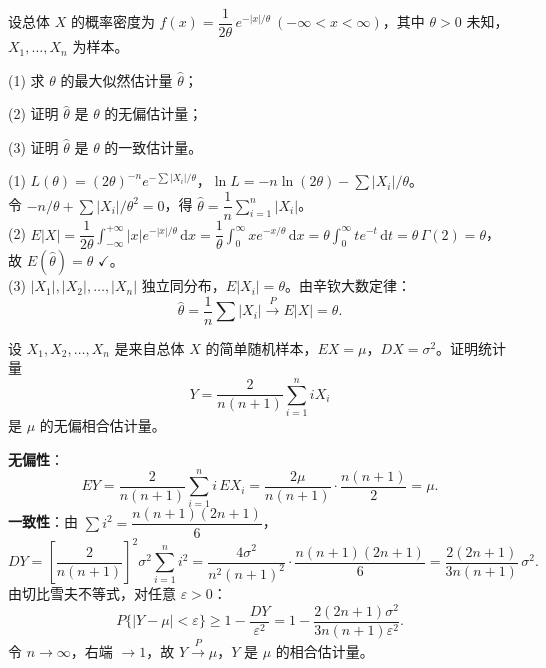 \documentclass[lang=cn,11pt]{elegantbook}
\begin{document}
\begin{exercise}\label{exer:7-laplace}
设总体 \(X\) 的概率密度为 \(f(x) = \dfrac{1}{2\theta}\,e^{-|x|/\theta}\ (-\infty < x < \infty)\)，其中 \(\theta > 0\) 未知，\(X_1, \dots, X_n\) 为样本。\par
(1) 求 \(\theta\) 的最大似然估计量 \(\hat{\theta}\)；\par
(2) 证明 \(\hat{\theta}\) 是 \(\theta\) 的无偏估计量；\par
(3) 证明 \(\hat{\theta}\) 是 \(\theta\) 的一致估计量。
\end{exercise}
\begin{solution}
(1) \(L(\theta) = (2\theta)^{-n}e^{-\sum|X_i|/\theta}\)，\(\ln L = -n\ln(2\theta) - \sum|X_i|/\theta\)。\\
令 \(-n/\theta + \sum|X_i|/\theta^2 = 0\)，得 \(\hat{\theta} = \dfrac{1}{n}\sum_{i=1}^{n}|X_i|\)。\\
(2) \(E|X| = \dfrac{1}{2\theta}\displaystyle\int_{-\infty}^{+\infty}|x|e^{-|x|/\theta}\,\mathrm{d}x = \dfrac{1}{\theta}\int_0^\infty xe^{-x/\theta}\,\mathrm{d}x = \theta\int_0^\infty te^{-t}\,\mathrm{d}t = \theta\,\Gamma(2) = \theta\)，故 \(E(\hat{\theta}) = \theta\) \(\checkmark\)。\\
(3) \(|X_1|, |X_2|, \dots, |X_n|\) 独立同分布，\(E|X_i| = \theta\)。由辛钦大数定律：
\[
\hat{\theta} = \frac{1}{n}\sum|X_i| \xrightarrow{P} E|X| = \theta. 
\]
\end{solution}


\begin{exercise}\label{exer:7-consistent}
设 \(X_1, X_2, \dots, X_n\) 是来自总体 \(X\) 的简单随机样本，\(EX = \mu\)，\(DX = \sigma^2\)。证明统计量
\[
Y = \frac{2}{n(n+1)}\sum_{i=1}^{n}iX_i
\]
是 \(\mu\) 的无偏相合估计量。
\end{exercise}
\begin{solution}
\textbf{无偏性}：
\[
EY = \frac{2}{n(n+1)}\sum_{i=1}^{n}i\,EX_i = \frac{2\mu}{n(n+1)}\cdot\frac{n(n+1)}{2} = \mu.
\]
\textbf{一致性}：由 \(\sum i^2 = \dfrac{n(n+1)(2n+1)}{6}\)，
\[
DY = \left[\frac{2}{n(n+1)}\right]^{\!2}\sigma^2\sum_{i=1}^{n}i^2 = \frac{4\sigma^2}{n^2(n+1)^2}\cdot\frac{n(n+1)(2n+1)}{6} = \frac{2(2n+1)}{3n(n+1)}\,\sigma^2.
\]
由切比雪夫不等式，对任意 \(\varepsilon > 0\)：
\[
P\{|Y-\mu| < \varepsilon\} \geq 1 - \frac{DY}{\varepsilon^2} = 1 - \frac{2(2n+1)\sigma^2}{3n(n+1)\varepsilon^2}.
\]
令 \(n\to\infty\)，右端 \(\to 1\)，故 \(Y\xrightarrow{P}\mu\)，\(Y\) 是 \(\mu\) 的相合估计量。
\end{solution}
\end{document}
